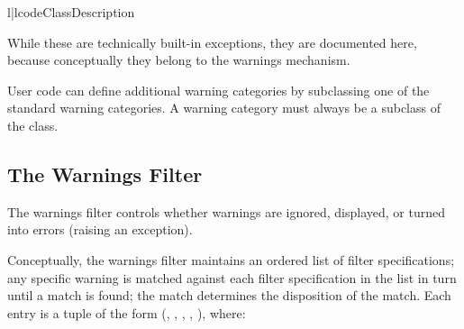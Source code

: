 \begin{tableii}{l|l}{code}{Class}{Description}






\end{tableii}

While these are technically built-in exceptions, they are documented
here, because conceptually they belong to the warnings mechanism.

User code can define additional warning categories by subclassing one
of the standard warning categories.  A warning category must always be
a subclass of the  class.


\subsection{The Warnings Filter}

The warnings filter controls whether warnings are ignored, displayed,
or turned into errors (raising an exception).

Conceptually, the warnings filter maintains an ordered list of filter
specifications; any specific warning is matched against each filter
specification in the list in turn until a match is found; the match
determines the disposition of the match.  Each entry is a tuple of the
form (, , , ,
), where:

